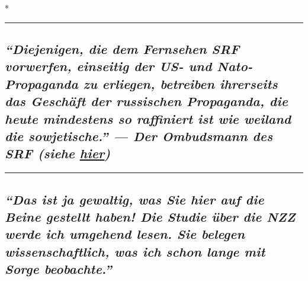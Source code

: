 *

\begin{center}\rule{0.5\linewidth}{\linethickness}\end{center}

\hypertarget{diejenigen-die-dem-fernsehen-srf-vorwerfen-einseitig-der-us--und-nato-propaganda-zu-erliegen-betreiben-ihrerseits-das-geschuxe4ft-der-russischen-propaganda-die-heute-mindestens-so-raffiniert-ist-wie-weiland-die-sowjetische--der-ombudsmann-des-srf-siehe-hier}{%
\subsection{\texorpdfstring{\emph{``Diejenigen, die dem Fernsehen SRF
vorwerfen, einseitig der US- und Nato-Propaganda zu erliegen, betreiben
ihrerseits das Geschäft der russischen Propaganda, die heute mindestens
so raffiniert ist wie weiland die sowjetische.'' --- Der Ombudsmann des
SRF (siehe
\href{https://swprs.org/srf-ombudsstelle-im-faktencheck/}{hier})}}{``Diejenigen, die dem Fernsehen SRF vorwerfen, einseitig der US- und Nato-Propaganda zu erliegen, betreiben ihrerseits das Geschäft der russischen Propaganda, die heute mindestens so raffiniert ist wie weiland die sowjetische.'' --- Der Ombudsmann des SRF (siehe hier)}}\label{diejenigen-die-dem-fernsehen-srf-vorwerfen-einseitig-der-us--und-nato-propaganda-zu-erliegen-betreiben-ihrerseits-das-geschuxe4ft-der-russischen-propaganda-die-heute-mindestens-so-raffiniert-ist-wie-weiland-die-sowjetische--der-ombudsmann-des-srf-siehe-hier}}

\begin{center}\rule{0.5\linewidth}{\linethickness}\end{center}

\hypertarget{das-ist-ja-gewaltig-was-sie-hier-auf-die-beine-gestellt-haben-die-studie-uxfcber-die-nzz-werde-ich-umgehend-lesen-sie-belegen-wissenschaftlich-was-ich-schon-lange-mit-sorge-beobachte}{%
\subsection{\texorpdfstring{\emph{``Das ist ja gewaltig, was Sie hier
auf die Beine gestellt haben! Die Studie über die NZZ werde ich umgehend
lesen. Sie belegen wissenschaftlich, was ich schon lange mit Sorge
beobachte.''}}{``Das ist ja gewaltig, was Sie hier auf die Beine gestellt haben! Die Studie über die NZZ werde ich umgehend lesen. Sie belegen wissenschaftlich, was ich schon lange mit Sorge beobachte.''}}\label{das-ist-ja-gewaltig-was-sie-hier-auf-die-beine-gestellt-haben-die-studie-uxfcber-die-nzz-werde-ich-umgehend-lesen-sie-belegen-wissenschaftlich-was-ich-schon-lange-mit-sorge-beobachte}}

